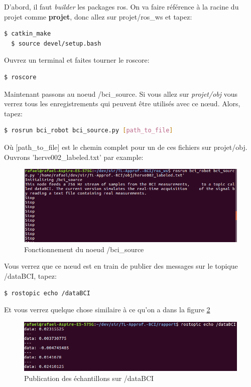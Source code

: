 D'abord, il faut \textit{builder} les packages ros. On va faire référence à la racine du projet comme \textbf{projet}, donc allez sur projet/ros\_ws et tapez:
\begin{lstlisting}[language=bash]
  $ catkin_make
  $ source devel/setup.bash
\end{lstlisting}

Ouvrez un terminal et faites tourner le roscore:

\begin{lstlisting}[language=bash]
  $ roscore
\end{lstlisting}

Maintenant passons au noeud /bci\_source. Si vous allez sur \textit{projet/obj} vous verrez tous les enregistrements qui peuvent être utilisés avec ce nœud. Alors, tapez: 
\begin{lstlisting}[language=bash]
  $ rosrun bci_robot bci_source.py [path_to_file]
\end{lstlisting}
Où [path\_to\_file] est le chemin complet pour un de ces fichiers sur projet/obj. Ouvrons 'herve002\_labeled.txt' par example:

\begin{figure}[!h]
  \centering
	\includegraphics[scale=0.50]{bci1.png}
	\caption{Fonctionnement du noeud /bci\_source}
	\label{fig:bci1}
\end{figure}

Vous verrez que ce nœud est en train de publier des messages sur le topique /dataBCI, tapez:
\begin{lstlisting}[language=bash]
  $ rostopic echo /dataBCI
\end{lstlisting}

Et vous verrez quelque chose similaire à ce qu'on a dans la figure \ref{fig:bci2}

\begin{figure}[!h]
  \centering
	\includegraphics[scale=0.50]{bci2.png}
	\caption{Publication des échantillons sur /dataBCI}
	\label{fig:bci2}
\end{figure}

